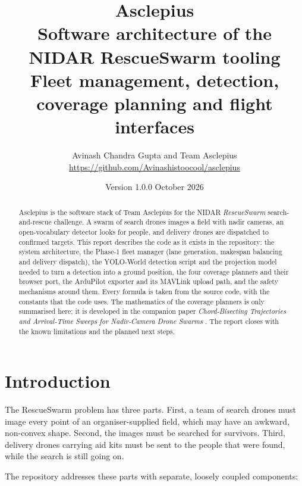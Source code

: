 \documentclass[11pt,a4paper]{article}
\title{\textbf{Asclepius}\\[4pt]\large Software architecture of the NIDAR RescueSwarm tooling\\[2pt]
\normalsize Fleet management, detection, coverage planning and flight interfaces}
\author{Avinash Chandra Gupta and Team Asclepius\\\small \url{https://github.com/Avinashistoocool/asclepius}}
\date{Version 1.0.0 \quad October 2026}
\begin{document}
\maketitle

\begin{abstract}
Asclepius is the software stack of Team Asclepius for the NIDAR \emph{RescueSwarm} search-and-rescue
challenge. A swarm of search drones images a field with nadir cameras, an open-vocabulary detector looks
for people, and delivery drones are dispatched to confirmed targets. This report describes the code as it
exists in the repository: the system architecture, the Phase-1 fleet manager (lane generation, makespan
balancing and delivery dispatch), the YOLO-World detection script and the projection model needed to turn
a detection into a ground position, the four coverage planners and their browser port, the ArduPilot
exporter and its MAVLink upload path, and the safety mechanisms around them. Every formula is taken from
the source code, with the constants that the code uses. The mathematics of the coverage planners is only
summarised here; it is developed in the companion paper \emph{Chord-Bisecting Trajectories and
Arrival-Time Sweeps for Nadir-Camera Drone Swarms} \cite{coverage}. The report closes with the known
limitations and the planned next steps.
\end{abstract}

\tableofcontents
\newpage

\section{Introduction}

The RescueSwarm problem has three parts. First, a team of search drones must image every point of an
organiser-supplied field, which may have an awkward, non-convex shape. Second, the images must be searched
for survivors. Third, delivery drones carrying aid kits must be sent to the people that were found, while
the search is still going on.

The repository addresses these parts with separate, loosely coupled components:
\end{document}
